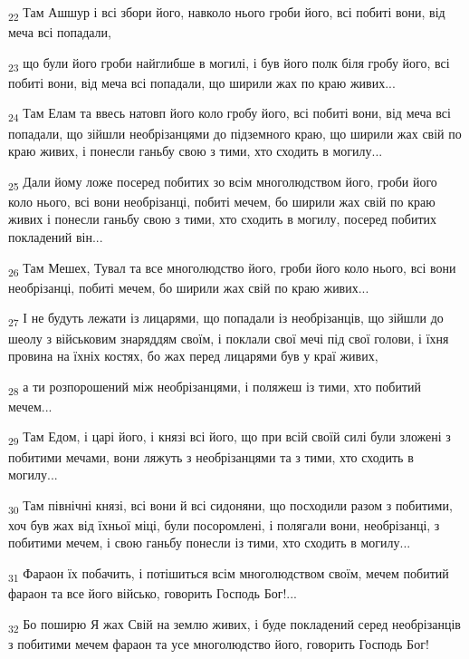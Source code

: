 \begin{tcolorbox}
\textsubscript{22} Там Ашшур і всі збори його, навколо нього гроби його, всі побиті вони, від меча всі попадали,
\end{tcolorbox}
\begin{tcolorbox}
\textsubscript{23} що були його гроби найглибше в могилі, і був його полк біля гробу його, всі побиті вони, від меча всі попадали, що ширили жах по краю живих...
\end{tcolorbox}
\begin{tcolorbox}
\textsubscript{24} Там Елам та ввесь натовп його коло гробу його, всі побиті вони, від меча всі попадали, що зійшли необрізанцями до підземного краю, що ширили жах свій по краю живих, і понесли ганьбу свою з тими, хто сходить в могилу...
\end{tcolorbox}
\begin{tcolorbox}
\textsubscript{25} Дали йому ложе посеред побитих зо всім многолюдством його, гроби його коло нього, всі вони необрізанці, побиті мечем, бо ширили жах свій по краю живих і понесли ганьбу свою з тими, хто сходить в могилу, посеред побитих покладений він...
\end{tcolorbox}
\begin{tcolorbox}
\textsubscript{26} Там Мешех, Тувал та все многолюдство його, гроби його коло нього, всі вони необрізанці, побиті мечем, бо ширили жах свій по краю живих...
\end{tcolorbox}
\begin{tcolorbox}
\textsubscript{27} І не будуть лежати із лицарями, що попадали із необрізанців, що зійшли до шеолу з військовим знаряддям своїм, і поклали свої мечі під свої голови, і їхня провина на їхніх костях, бо жах перед лицарями був у краї живих,
\end{tcolorbox}
\begin{tcolorbox}
\textsubscript{28} а ти розпорошений між необрізанцями, і поляжеш із тими, хто побитий мечем...
\end{tcolorbox}
\begin{tcolorbox}
\textsubscript{29} Там Едом, і царі його, і князі всі його, що при всій своїй силі були зложені з побитими мечами, вони ляжуть з необрізанцями та з тими, хто сходить в могилу...
\end{tcolorbox}
\begin{tcolorbox}
\textsubscript{30} Там північні князі, всі вони й всі сидоняни, що посходили разом з побитими, хоч був жах від їхньої міці, були посоромлені, і полягали вони, необрізанці, з побитими мечем, і свою ганьбу понесли із тими, хто сходить в могилу...
\end{tcolorbox}
\begin{tcolorbox}
\textsubscript{31} Фараон їх побачить, і потішиться всім многолюдством своїм, мечем побитий фараон та все його військо, говорить Господь Бог!...
\end{tcolorbox}
\begin{tcolorbox}
\textsubscript{32} Бо поширю Я жах Свій на землю живих, і буде покладений серед необрізанців з побитими мечем фараон та усе многолюдство його, говорить Господь Бог!
\end{tcolorbox}
